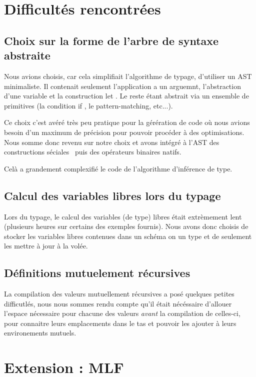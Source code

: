 \documentclass[a4paper]{article}
\begin{document}
\section{Difficultés rencontrées}

\subsection{Choix sur la forme de l'arbre de syntaxe abstraite}
Nous avions choisis, car cela simplifiait l'algorithme de typage,
d'utiliser un AST minimaliste. Il contenait seulement l'application a
un arguemnt, l'abstraction d'une variable et la construction \og let
\fg. Le reste étant abstrait via un ensemble de primitives (la
condition \og if \fg, le pattern-matching, etc...).

Ce choix c'est avéré très peu pratique pour la gérération de code où
nous avions besoin d'un maximum de précision pour pouvoir procéder à
des optimisations. Nous somme donc revenu sur notre choix et avons
intégré à l'AST des \og constructions séciales \fg~puis des opérateurs
binaires natifs.

Celà a grandement complexifié le code de l'algorithme d'inférence de type.

\subsection{Calcul des variables libres lors du typage}

Lors du typage, le calcul des variables (de type) libres était
extrèmement lent (plusieurs heures sur certains des exemples fournis).
Nous avons donc choisis de stocker les variables libres contenues dans
un schéma on un type et de seulement les mettre à jour à la volée.


\subsection{Définitions mutuelement récursives}

La compilation des valeurs mutuellement récursives a posé quelques
petites difficutlés, nous nous sommes rendu compte qu'il était
nécéssaire d'allouer l'espace nécessaire pour chacune des valeurs
\emph{avant} la compilation de celles-ci, pour connaitre leurs
emplacements dans le tas et pouvoir les ajouter à leurs environements
mutuels.

\section{Extension : MLF}
\end{document}
